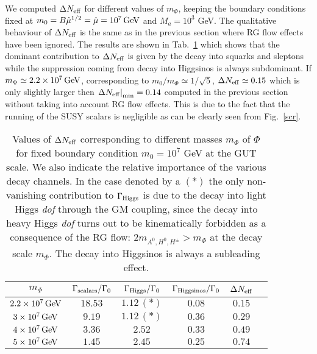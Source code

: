 \documentclass[11pt,a4paper]{article}
\begin{document}
We computed $\Delta N_{\rm eff}$ for different values of $m_\Phi$, keeping the boundary conditions fixed at $m_0 = B\hat\mu^{1/2} = \hat\mu = 10^7 \, \rm GeV$ and $M_a = 10^3$ GeV. The qualitative behaviour of $\Delta N_{\rm eff}$ is the same as in the previous section where RG flow effects have been ignored. The results are shown in Tab.~\ref{tab1} which shows that the dominant contribution to $\Delta N_{\rm eff}$ is given by the decay into squarks and sleptons while the suppression coming from decay into Higgsinos is always subdominant. If $m_\Phi \simeq 2.2 \times 10^7 \, \rm GeV$, corresponding to $m_0/m_\Phi \simeq 1/\sqrt{5}$, $\Delta N_{\rm eff} \simeq 0.15$ which is only slightly larger then $\left.\Delta N_{\rm eff}\right|_{\rm min} = 0.14$ computed in the previous section without taking into account RG flow effects. This is due to the fact that the running of the SUSY scalars is negligible as can be clearly seen from Fig.~\ref{scr}.

\begin{table}[h!]
\begin{center}
\begin{tabular}{cccccc}
\hline
$m_\Phi$ & $\Gamma_{\rm scalars}/\Gamma_0$ & $\Gamma_{\rm Higgs}/\Gamma_0$ & $\Gamma_{\rm Higgsinos}/\Gamma_0$ & $\Delta N_{\rm eff}$  \\
\hline
$2.2 \times 10^7 \, \rm GeV$ & $18.53$ & $1.12 \,(*)$ & $0.08$  & $0.15$ \\
\hline
$3 \times 10^7 \, \rm GeV$ & $9.19$ & $1.12 \,(*)$ & $0.36$ & $0.29$ \\
\hline
$4 \times 10^7 \, \rm GeV$ & $3.36$ & $2.52$ & $0.33$ & $0.49$ \\
\hline
$5 \times 10^7 \, \rm GeV$ & $1.45$ & $2.45$ & $0.25$ & $0.74$ \\
\hline
\end{tabular}
\end{center}
\caption{Values of $\Delta N_{\rm eff}$ corresponding to different masses $m_\Phi$ of $\Phi$ for fixed boundary condition $m_0 = 10^7$ GeV at the GUT scale. We also indicate the relative importance of the various decay channels. In the case denoted by a $(*)$ the only non-vanishing contribution to $\Gamma_{\rm Higgs}$ is due to the decay into light Higgs \textit{dof} through the GM coupling, since the decay into heavy Higgs \textit{dof} turns out to be kinematically forbidden as a consequence of the RG flow: $2 m_{A^0, H^0, H^\pm} > m_\Phi$ at the decay scale $m_\Phi$. The decay into Higgsinos is always a subleading effect.}
\label{tab1}
\end{table}
\end{document}
